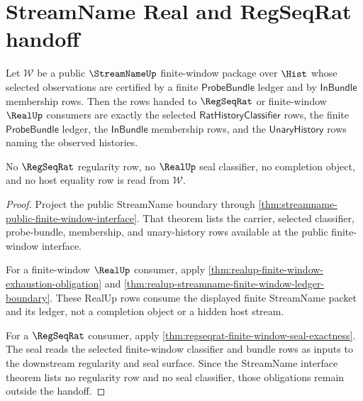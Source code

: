 \section{StreamName Real and RegSeqRat handoff}
\label{sec:streamname-real-regseq-handoff}

\begin{theorem}
\label{thm:streamname-real-regseq-finite-window-handoff}
Let $\mathcal{W}$ be a public $\StreamNameUp$ finite-window package over
$\Hist$ whose selected observations are certified by a finite
$\mathsf{ProbeBundle}$ ledger and by $\mathsf{InBundle}$ membership rows. Then
the rows handed to $\RegSeqRat$ or finite-window $\RealUp$ consumers are exactly
the selected $\mathsf{RatHistoryClassifier}$ rows, the finite
$\mathsf{ProbeBundle}$ ledger, the $\mathsf{InBundle}$ membership rows, and the
$\mathsf{UnaryHistory}$ rows naming the observed histories.

No $\RegSeqRat$ regularity row, no $\RealUp$ seal classifier, no completion
object, and no host equality row is read from $\mathcal{W}$.
\end{theorem}
\begin{proof}
Project the public StreamName boundary through
\autoref{thm:streamname-public-finite-window-interface}. That theorem lists the
carrier, selected classifier, probe-bundle, membership, and unary-history rows
available at the public finite-window interface.

For a finite-window $\RealUp$ consumer, apply
\autoref{thm:realup-finite-window-exhaustion-obligation} and
\autoref{thm:realup-streamname-finite-window-ledger-boundary}. These RealUp
rows consume the displayed finite StreamName packet and its ledger, not a
completion object or a hidden host stream.

For a $\RegSeqRat$ consumer, apply
\autoref{thm:regseqrat-finite-window-seal-exactness}. The seal reads the
selected finite-window classifier and bundle rows as inputs to the downstream
regularity and seal surface. Since the StreamName interface theorem lists no
regularity row and no seal classifier, those obligations remain outside the
handoff.
\end{proof}

